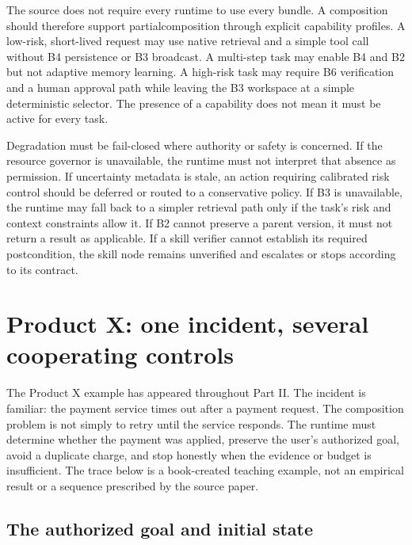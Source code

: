 The source does not require every runtime to use every bundle. A composition should therefore support \gls{partialcomposition} through explicit capability profiles. A low-risk, short-lived request may use native retrieval and a simple tool call without B4 persistence or B3 broadcast. A multi-step task may enable B4 and B2 but not adaptive memory learning. A high-risk task may require B6 verification and a human approval path while leaving the B3 workspace at a simple deterministic selector. The presence of a capability does not mean it must be active for every task.

Degradation must be fail-closed where authority or safety is concerned. If the resource governor is unavailable, the runtime must not interpret that absence as permission. If uncertainty metadata is stale, an action requiring calibrated risk control should be deferred or routed to a conservative policy. If B3 is unavailable, the runtime may fall back to a simpler retrieval path only if the task's risk and context constraints allow it. If B2 cannot preserve a parent version, it must not return a result as applicable. If a skill verifier cannot establish its required postcondition, the skill node remains unverified and escalates or stops according to its contract.


\section{Product X: one incident, several cooperating controls}
\label{sec:ch18-productx-composition}

The Product X example has appeared throughout Part II. The incident is familiar: the payment service times out after a payment request. The composition problem is not simply to retry until the service responds. The runtime must determine whether the payment was applied, preserve the user's authorized goal, avoid a duplicate charge, and stop honestly when the evidence or budget is insufficient. The trace below is a book-created teaching example, not an empirical result or a sequence prescribed by the source paper.

\subsection{The authorized goal and initial state}
\label{subsec:ch18-productx-goal}

